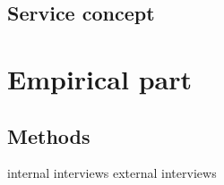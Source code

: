 \documentclass[12pt,a4paper,oneside,pdftex]{report}
\begin{document}




\section{Service concept}

% 

\chapter{Empirical part}
\label{chapter:methods}
\section{Methods}

internal interviews
external interviews
\end{document}
